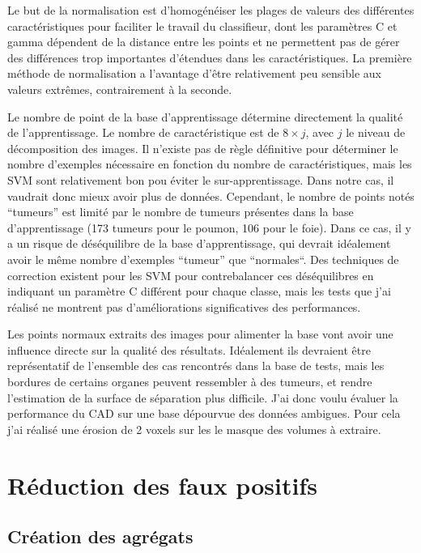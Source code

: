 Le but de la normalisation est d'homogénéiser les plages de valeurs des différentes caractéristiques pour faciliter le travail du classifieur, dont les paramètres C et gamma dépendent de la distance entre les points et ne permettent pas de gérer des différences trop importantes d'étendues dans les caractéristiques. La première méthode de normalisation a l'avantage d'être relativement peu sensible aux valeurs extrêmes, contrairement à la seconde.

Le nombre de point de la base d'apprentissage détermine directement la qualité de l'apprentissage. Le nombre de caractéristique est de $8 \times j$, avec $j$ le niveau de décomposition des images. Il n'existe pas de règle définitive pour déterminer le nombre d'exemples nécessaire en fonction du nombre de caractéristiques, mais les SVM sont relativement bon pou éviter le sur-apprentissage. Dans notre cas, il vaudrait donc mieux avoir plus de données. Cependant, le nombre de points notés ``tumeurs'' est limité par le nombre de tumeurs présentes dans la base d'apprentissage (173 tumeurs pour le poumon, 106 pour le foie). Dans ce cas, il y a un risque de déséquilibre de la base d'apprentissage, qui devrait idéalement avoir le même nombre d'exemples ``tumeur'' que ``normales``. Des techniques de correction existent pour les SVM pour contrebalancer ces déséquilibres en indiquant un paramètre C différent pour chaque classe, mais les tests que j'ai réalisé ne montrent pas d'améliorations significatives des performances.

Les points normaux extraits des images pour alimenter la base vont avoir une influence directe sur la qualité des résultats. Idéalement ils devraient être représentatif de l'ensemble des cas rencontrés dans la base de tests, mais les bordures de certains organes peuvent ressembler à des tumeurs, et rendre l'estimation de la surface de séparation plus difficile. J'ai donc voulu évaluer la performance du CAD sur une base dépourvue des données ambigues. Pour cela j'ai réalisé une érosion de 2 voxels sur les le masque des volumes à extraire.

\section{Réduction des faux positifs}

\subsection{Création des agrégats}


